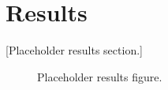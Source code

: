 \section{Results}
[Placeholder results section.]

\begin{figure}[htbp]
  \caption{Placeholder results figure.}
  \label{fig:ch2-results}
\end{figure}

